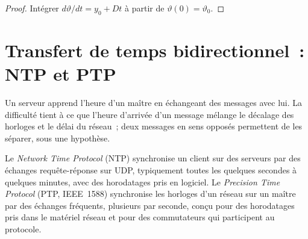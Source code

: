 \begin{proof}
Intégrer $d\vartheta/dt = y_0 + Dt$ à partir de $\vartheta(0) = \vartheta_0$.
\end{proof}

\section{Transfert de temps bidirectionnel~: NTP et PTP}

Un serveur apprend l'heure d'un maître en échangeant des messages avec lui. La difficulté tient à ce que l'heure d'arrivée d'un
message mélange le décalage des horloges et le délai du réseau~; deux messages en sens opposés permettent de les séparer, sous une hypothèse.

\begin{definition}\label{def:nw:time-synchronisation:protocols}
Le \emph{Network Time Protocol} (NTP) synchronise un client sur des serveurs par des échanges
requête-réponse sur UDP, typiquement toutes les quelques secondes à quelques minutes, avec des horodatages pris en logiciel. Le \emph{Precision Time
Protocol} (PTP, IEEE~1588) synchronise les horloges d'un réseau sur un maître par des échanges fréquents, plusieurs par
seconde, conçu pour des horodatages pris dans le matériel réseau et pour des commutateurs qui participent au protocole.
\end{definition}

\begin{omfigure}

\label{fig:nw:time-synchronisation:exchange}
\end{omfigure}

